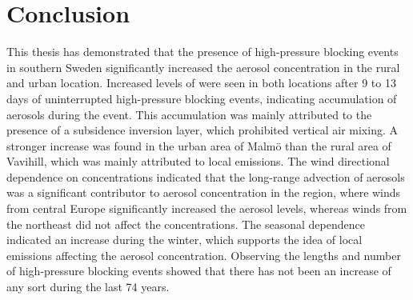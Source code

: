 \section{Conclusion}
This thesis has demonstrated that the presence of high-pressure blocking events in southern Sweden significantly increased the aerosol concentration in the rural and urban location. Increased levels of \PM were seen in both locations after 9 to 13 days of uninterrupted high-pressure blocking events, indicating accumulation of aerosols during the event. This accumulation was mainly attributed to the presence of a subsidence inversion layer, which prohibited vertical air mixing. A stronger increase was found in the urban area of Malmö than the rural area of Vavihill, which was mainly attributed to local emissions. The wind directional dependence on \PM concentrations indicated that the long-range advection of aerosols was a significant contributor to aerosol concentration in the region, where winds from central Europe significantly increased the aerosol levels, whereas winds from the northeast did not affect the concentrations. The seasonal dependence indicated an increase during the winter, which supports the idea of local emissions affecting the aerosol concentration. Observing the lengths and number of high-pressure blocking events showed that there has not been an increase of any sort during the last 74 years.

